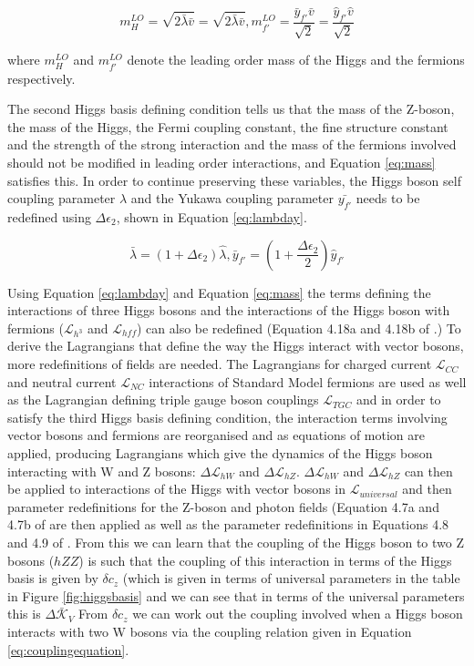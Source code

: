 \documentclass[11pt,oneside,a4paper]{article}
\begin{document}
\begin{equation}
\label{eq:mass}
m_{H}^{LO} = \sqrt{2\bar{\lambda}\bar{v}} = \sqrt{2\bar{\lambda}\bar{v}} ,    m_{f'}^{LO} = \frac{\bar{y}_{f'}\bar{v}}{\sqrt{2}} = \frac{\hat{y}_{f'}\hat{v}}{\sqrt{2}}
\end{equation}

where $m_{H}^{LO}$ and $m_{f'}^{LO}$ denote the leading order mass of the Higgs and the fermions respectively. 

The second Higgs basis defining condition tells us that the mass of the Z-boson, the mass of the Higgs, the Fermi coupling constant, the fine structure constant and the strength of the strong interaction and the mass of the fermions involved should not be modified in leading order interactions, and Equation \ref{eq:mass} satisfies this. In order to continue preserving these variables, the Higgs boson self coupling parameter $\lambda$ and the Yukawa coupling parameter $\bar{y_{f'}}$ needs to be redefined  using $\Delta\epsilon_{2}$, shown in Equation \ref{eq:lambday}.

\begin{equation}
\label{eq:lambday}
\bar{\lambda} = (1 + \Delta\epsilon_{2})\hat{\lambda}, \bar{y}_{f'} = (1 + \frac{\Delta\epsilon_{2}}{2})\hat{y}_{f'}
\end{equation}

Using Equation \ref{eq:lambday} and Equation \ref{eq:mass} the terms defining the interactions of three Higgs bosons and the interactions of the Higgs boson with fermions ($\mathcal{L}_{h^3}$ and $\mathcal{L}_{hff}$) can also be redefined (Equation 4.18a and 4.18b of \cite{universal}.) To derive the Lagrangians that define the way the Higgs interact with vector bosons, more redefinitions of fields are needed. The Lagrangians for charged current $\mathcal{L}_{CC}$ and neutral current $\mathcal{L}_{NC}$ interactions of Standard Model fermions are used as well as the Lagrangian defining triple gauge boson couplings $\mathcal{L}_{TGC}$ and in order to satisfy the third Higgs basis defining condition, the interaction terms involving vector bosons and fermions are reorganised and as equations of motion are applied, producing Lagrangians which give the dynamics of the Higgs boson interacting with W and Z bosons: $\Delta\mathcal{L}_{hW}$ and $\Delta\mathcal{L}_{hZ}$. $\Delta\mathcal{L}_{hW}$ and $\Delta\mathcal{L}_{hZ}$ can then be applied to interactions of the Higgs with vector bosons in $\mathcal{L}_{universal}$ and then parameter redefinitions for the Z-boson and photon fields (Equation 4.7a and 4.7b of \cite{universal} are then applied as well as the parameter redefinitions in Equations 4.8 and 4.9 of \cite{universal}. From this we can learn that the coupling of the Higgs boson to two Z bosons ($hZZ$) is such that the coupling of this interaction in terms of the Higgs basis is given by $\delta c_{z}$ (which is given in terms of universal parameters in the table in Figure \ref{fig:higgsbasis} and we can see that in terms of the universal parameters this is $\Delta \bar{\mathcal{K}}_{V}$ From $\delta c_{z}$ we can work out the coupling involved when a Higgs boson interacts with two W bosons via the coupling relation given in Equation \ref{eq:couplingequation}.
\end{document}
